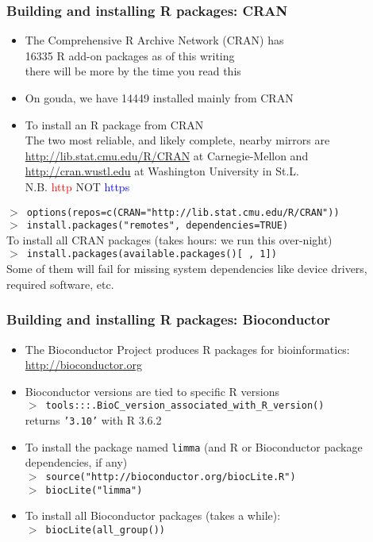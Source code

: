 \documentclass[11pt,pdftex,dvipsnames,usenames,helvetica]{beamer}
\begin{document}
\begin{frame}[fragile]
\frametitle{Building and installing R packages: CRAN}
\begin{itemize}
\item The Comprehensive R Archive Network (CRAN) has\\
 16335 R add-on packages as of this writing\\
there will be more by the time you read this
\item On gouda, we have 14449 installed mainly from CRAN
\item To install an R package from CRAN\\
The two most reliable, and likely complete, nearby mirrors are 
\url{http://lib.stat.cmu.edu/R/CRAN} at Carnegie-Mellon and
\url{http://cran.wustl.edu} at Washington University in St.L.\\
N.B. \textcolor{red}{http} NOT  \textcolor{blue}{https} 
\end{itemize}
{\tt $>$~options(repos=c(CRAN="http://lib.stat.cmu.edu/R/CRAN")) \\
$>$ install.packages("remotes", dependencies=TRUE) }\\
To install all CRAN packages (takes hours: we run this over-night)\\
{\tt $>$ install.packages(available.packages()[ , 1])}\\
Some of them will fail for missing system dependencies like
device drivers, required software, etc.
\end{frame}

\begin{frame}[fragile]
\frametitle{Building and installing R packages: Bioconductor}
\begin{itemize}
\item The Bioconductor Project produces R packages for bioinformatics: 
\url{http://bioconductor.org}
\item Bioconductor versions are tied to specific R versions\\
{\tt $>$~tools:::.BioC\_version\_associated\_with\_R\_version()}\\
returns {\tt '3.10'} with R 3.6.2
\item  To install the package named {\tt limma} (and R or Bioconductor package dependencies, if any)\\
{\tt $>$ source("http://bioconductor.org/biocLite.R")\\
$>$ biocLite("limma")}
\item 
To install all Bioconductor packages (takes a while):\\
{\tt $>$ biocLite(all\_group())}
\end{itemize}
\end{frame}
\end{document}
